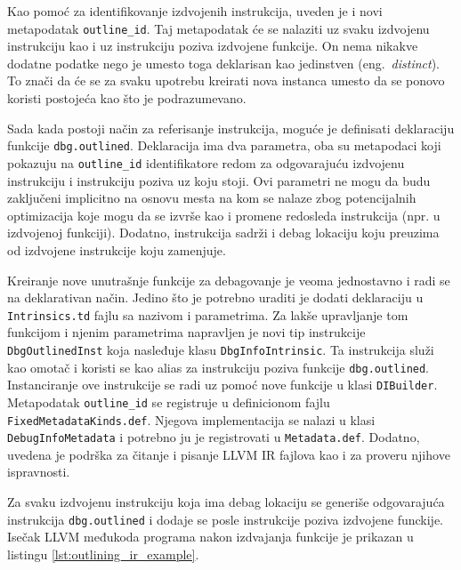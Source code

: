 \documentclass[12pt,oneside]{memoir}
\begin{document}
Kao pomoć za identifikovanje izdvojenih instrukcija, uveden je i novi metapodatak \verb|outline_id|.
Taj metapodatak će se nalaziti uz svaku izdvojenu instrukciju kao i uz instrukciju poziva izdvojene funkcije.
On nema nikakve dodatne podatke nego je umesto toga deklarisan kao jedinstven (eng.~{\em distinct}).
To znači da će se za svaku upotrebu kreirati nova instanca umesto da se ponovo koristi postojeća kao što je podrazumevano.

Sada kada postoji način za referisanje instrukcija, moguće je definisati deklaraciju funkcije \verb|dbg.outlined|.
Deklaracija ima dva parametra, oba su metapodaci koji pokazuju na \verb|outline_id| identifikatore redom za odgovarajuću izdvojenu instrukciju i instrukciju poziva uz koju stoji.
Ovi parametri ne mogu da budu zaključeni implicitno na osnovu mesta na kom se nalaze zbog potencijalnih optimizacija koje mogu da se izvrše kao i promene redosleda instrukcija (npr. u izdvojenoj funkciji).
Dodatno, instrukcija sadrži i debag lokaciju koju preuzima od izdvojene instrukcije koju zamenjuje.

Kreiranje nove unutrašnje funkcije za debagovanje je veoma jednostavno i radi se na deklarativan način.
Jedino što je potrebno uraditi je dodati deklaraciju u \verb|Intrinsics.td| fajlu sa nazivom i parametrima.
Za lakše upravljanje tom funkcijom i njenim parametrima napravljen je novi tip instrukcije \verb|DbgOutlinedInst| koja nasleđuje klasu \verb|DbgInfoIntrinsic|.
Ta instrukcija služi kao omotač i koristi se kao alias za instrukciju poziva funkcije \verb|dbg.outlined|. 
Instanciranje ove instrukcije se radi uz pomoć nove funkcije u klasi \verb|DIBuilder|.
Metapodatak \verb|outline_id| se registruje u definicionom fajlu \verb|FixedMetadataKinds.def|.
Njegova implementacija se nalazi u klasi \verb|DebugInfoMetadata| i potrebno ju je registrovati u \verb|Metadata.def|.
Dodatno, uvedena je podrška za čitanje i pisanje LLVM IR fajlova kao i za proveru njihove ispravnosti.

Za svaku izdvojenu instrukciju koja ima debag lokaciju se generiše odgovarajuća instrukcija \verb|dbg.outlined| i dodaje se posle instrukcije poziva izdvojene funckije.
Isečak LLVM međukoda programa nakon izdvajanja funkcije je prikazan u listingu \ref{lst:outlining_ir_example}.
\end{document}
